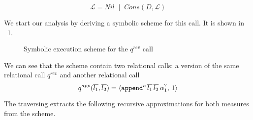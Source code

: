 \[ \mathcal{L} = Nil \; \mid \; Cons(D, \mathcal{L}) \]

We start our analysis by deriving a symbolic scheme for this call. It is shown in \figureword~\ref{fig:reverso_scheme}.

\begin{figure}[t]
\begin{center}
\end{center}

\caption{Symbolic execution scheme for the $q^{rev}$ call}
\label{fig:reverso_scheme}
\end{figure}


We can see that the scheme contain two relational calls: a version of the same relational call $q^{rev}$ and another relational call \[ q^{app}(\overline{l_1}, \overline{l_2}) = \langle \texttt{append$^o$} \, \overline{l_1} \, \overline{l_2} \, \alpha_1^?  ,\, 1 \rangle \]

The traversing extracts the following recursive approximations for both measures from the scheme.

